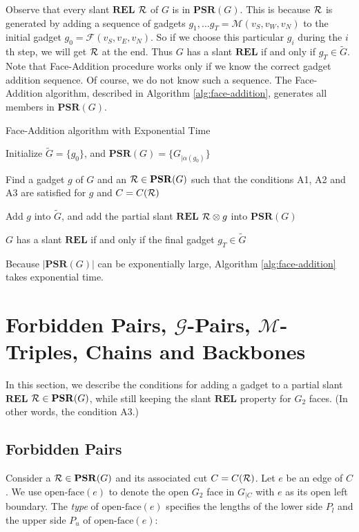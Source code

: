 \documentclass[11pt]{article}
\newcommand{\R}{{\cal R}}
\newcommand{\FF}{\mathcal{F}}
\newcommand{\MM}{\mathcal{M}}
\newcommand{\GG}{\mathcal{G}}
\newcommand{\REL}{\mathbf{REL}}
\newcommand{\PSR}{\mathbf{PSR}}
\begin{document}
Observe that every slant $\REL$ $\R$ of $G$ is in $\PSR(G)$. This is because
$\R$ is generated by adding a sequence of gadgets $g_1, \ldots g_T=\MM(v_S,v_W,v_N)$
to the initial gadget $g_0= \FF(v_S,v_E,v_N)$.
So if we choose this particular $g_i$ during the $i$th step, we will get $\R$
at the end. Thus $G$ has a slant $\REL$ if and only if $g_T \in \tilde{G}$.
Note that Face-Addition procedure works only if we know the correct
gadget addition sequence. Of course, we do not know such a sequence.
The Face-Addition algorithm, described in Algorithm
\ref{alg:face-addition}, generates all members in $\PSR(G)$.

\begin{algorithm}[htb]
\caption{Face-Addition algorithm with Exponential Time}
\label{alg:face-addition}

Initialize $\tilde{G}=\{ g_0\}$,
and $\PSR(G)=\{G_{|\alpha(g_0)}\}$\;

\Repeat{no such $g$ and $\R$ can be found}
{
Find a gadget $g$ of $G$ and an $\R\in \PSR(G)$ such that
the conditions A1, A2 and A3 are satisfied for $g$ and $C=C(\R)$\;

Add $g$ into $\tilde{G}$,
and add the partial slant $\REL$ $\R \otimes g$ into $\PSR(G)$\;
}

$G$ has a slant $\REL$ if and only if the final gadget $g_T \in \tilde{G}$\;
\end{algorithm}

Because $|\PSR(G)|$ can be exponentially large, Algorithm
\ref{alg:face-addition} takes exponential time.

\section{Forbidden Pairs, $\GG$-Pairs, $\MM$-Triples, Chains and Backbones}
\label{sec:concept}

In this section, we describe the conditions for adding a gadget to a
partial slant $\REL$ $\R \in \PSR(G)$, while still keeping the slant
$\REL$ property for $G_2$ faces. (In other words, the condition A3.)

\subsection{Forbidden Pairs}\label{sec:forbidden}

Consider a $\R \in \PSR(G)$ and its associated cut $C=C(\R)$.
Let $e$ be an edge of $C$. We use $\mbox{open-face}(e)$ to denote the
open $G_2$ face in $G_{|C}$ with $e$ as its open left boundary.
The {\em type} of $\mbox{open-face}(e)$ specifies the lengths of the
lower side $P_l$ and the upper side $P_u$ of $\mbox{open-face}(e)$:
\end{document}
